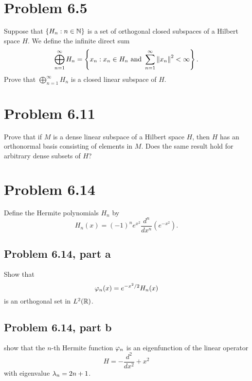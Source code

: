 \newpage
\section{Problem 6.5}
Suppose that $\{H_n : n \in \mathbb{N}\}$ is a set of orthogonal closed subspaces of a Hilbert space $H$. We define the infinite direct sum
\[\bigoplus_{n = 1}^\infty H_n = \left \{ x_n : x_n \in H_n \text{ and } \sum_{n=1}^\infty \norm{x_n}^2 < \infty\right\}.\]
Prove that $\bigoplus_{n = 1}^\infty H_n$ is a closed linear subspace of $H$.

\newpage
\section{Problem 6.11}
Prove that if $M$ is a dense linear subspace of a Hilbert space $H$, then $H$ has an orthonormal basis consisting of elements in $M$. Does the same result hold for arbitrary dense subsets of $H$?

\newpage
\section{Problem 6.14}
Define the Hermite polynomials $H_n$ by 
\[H_n(x) = (-1)^ne^{x^2} \frac{d^n}{dx^n}\left( e^{-x^2}\right).\]
\subsection{Problem 6.14, part a}
Show that 
\[\varphi_n(x)  = e^{-x^2/2}H_n(x)\]
is an orthogonal set in $L^2(\mathbb{R})$.

\newpage
\subsection{Problem 6.14, part b}
show that the $n$-th Hermite function $\varphi_n$ is an eigenfunction of the linear operator
\[H = -\frac{d^2}{dx^2} + x^2\]
with eigenvalue $\mathrm{\lambda}_n = 2n+1$.
